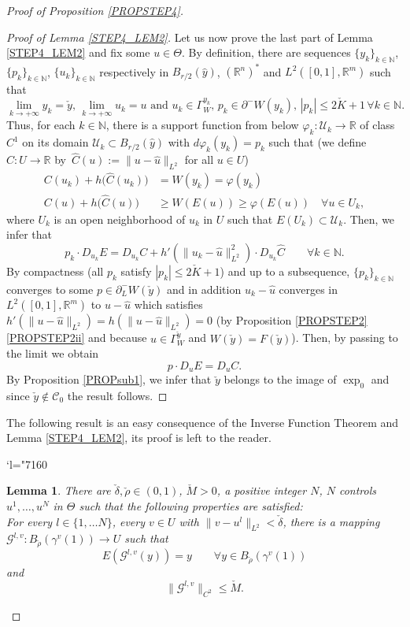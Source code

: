 \documentclass[JEP,XML,SOM,Unicode,NoFloatCountersInSection,published]{cedram}
\newcommand{\Changel}{\mathcode`l="7160}
\newcommand\R{\mathbb R}
\newcommand\N{\mathbb N}
\newtheorem{lemma}[theorem]{Lemma}
\theoremstyle{definition}
\begin{document}
\begin{proof}[Proof of Proposition \ref{PROPSTEP4}]
\begin{proof}[Proof of Lemma \ref{STEP4_LEM2}]
Let us now prove the last part of Lemma \ref{STEP4_LEM2} and fix some $u\in \Theta$. By definition, there are sequences $\{y_k\}_{k\in \N}$, $ \{p_k\}_{k\in \N}$, $ \{u_k\}_{k\in \N}$ respectively in $B_{r/2}(\hat{y})$, $(\R^n)^*$ and $L^2([0,1],\R^m)$ such that
\[
\lim_{k\to +\infty}y_k = \check{y}, \, \lim_{k\to +\infty}u_k = u \text{ and } u_k\in \Gamma_W^{y_k}, \, p_k \in \partial^- W(y_k), \, |p_k|\leq 2\check{K}+1 \, \forall k \in \N.
\]
Thus, for each $k\in \N$, there is a support function from below $\varphi_k: \mathcal{U}_k \to \R$ of class $C^1$ on its domain $\mathcal{U}_k \subset B_{r/2}(\hat{y})$ with $d\varphi_k(y_k)=p_k$ such that (we define $\hat{C}:U\to \R$ by~$\hat{C}(u):=\|u-\hat{u}\|_{L^2}$ for all $u\in U$)
\begin{align*}
C(u_k) + h\bigl(\hat{C}(u_k)\bigr) &= W(y_k) = \varphi(y_k) \\
\tag*{and} C(u) + h\bigl(\hat{C}(u)\bigr) &\geq W\left(E(u)\right) \geq \varphi \left(E(u)\right) \quad \forall u\in U_k,
\end{align*}
where $U_k$ is an open neighborhood of $u_k$ in $U$ such that $E(U_k)\subset \mathcal{U}_k$. Then, we infer that
\[
p_k\cdot D_{u_k}E = D_{u_k}C + h'\left(\|u_k-\hat{u}\|_{L^2}^2\right) \cdot D_{u_k}\hat{C} \qquad \forall k \in \N.
\]
By compactness (all $p_k$ satisfy $|p_k|\leq 2\check{K}+1$) and up to a subsequence, $\{p_k\}_{k\in \N}$ converges to some $p\in \partial^-_LW(\check{y})$ and in addition
$u_k-\hat{u}$ converges in $L^2([0,1],\R^m)$ to $u-\hat{u}$ which satisfies $h'(\|u-\hat{u}\|_{L^2})=h(\|u-\hat{u}\|_{L^2})=0$ (by Proposition \ref{PROPSTEP2}\eqref{PROPSTEP2ii} and because $u\in \Gamma_W^{\check{y}}$ and $W(\check{y})=F(\check{y})$). Then, by passing to the limit we obtain
\[
p\cdot D_uE = D_uC.
\]
By Proposition \ref{PROPsub1}, we infer that $\check{y}$ belongs to the image of $\exp_0$ and since $\check{y}\notin \mathcal{C}_0$ the result follows.
\end{proof}

The following result is an easy consequence of the Inverse Function Theorem and Lemma \ref{STEP4_LEM2}, its proof is left to the reader.

\Changel

\begin{lemma}\label{STEP4_LEM3}
There are $\check{\delta}, \check{\rho} \in (0,1)$, $\check{M}>0$, a positive integer $N$, $N$ controls $u^1, \ldots, u^{N}$ in $\Theta$ such that the following properties are satisfied: \\
For every $l\in \{1, \ldots N\}$, every $v\in U$ with $\|v-u^l\|_{L^2} < \check{\delta}$, there is a mapping $\mathcal{G}^{l,v}:B_{\check{\rho}}(\gamma^v(1)) \to U$ such that
\[
E\left(\mathcal{G}^{l,v} (y)\right) = y \qquad \forall y \in B_{\check{\rho}}(\gamma^v(1))
\]
and
\[
\bigl\| \mathcal{G}^{l,v} \bigr\|_{C^2} \leq \check{M}.
\]
\end{lemma}


\end{proof}
\end{document}
